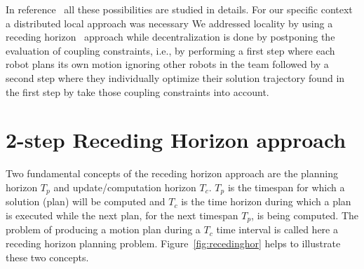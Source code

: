 In reference~\cite{Defoort2007a} all these possibilities are studied in details. For our specific context a distributed local approach was necessary
We addressed locality by using a receding horizon~\cite{TODO} approach while decentralization is done by postponing the evaluation of coupling constraints, i.e., by performing a first step where each robot plans its own motion ignoring other robots in the team followed by a second step where they individually optimize their solution trajectory found in the first step by take those coupling constraints into account.





%
%
%

\section{2-step Receding Horizon approach}\label{subsec:rha}




Two fundamental concepts of the receding horizon approach are the planning horizon $T_p$ and update/computation horizon $T_c$. $T_p$ is the timespan for which a solution (plan) will be computed and $T_c$ is the time horizon during which a plan is executed while the
next plan, for the next timespan $T_p$, is being computed.
The problem of producing a motion plan during a $T_c$ time interval is called
here a receding horizon planning problem. Figure~\ref{fig:recedinghor} helps to illustrate these two concepts.

